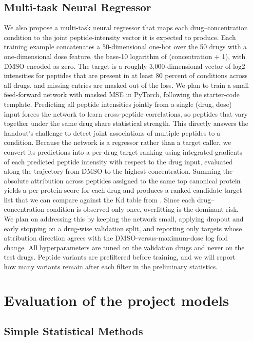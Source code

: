 \subsection{Multi-task Neural Regressor}
We also propose a multi-task neural regressor that maps each drug–concentration condition to the joint peptide-intensity vector it is expected to produce. Each training example concatenates a 50-dimensional one-hot over the 50 drugs with a one-dimensional dose feature, the base-10 logarithm of (concentration + 1), with DMSO encoded as zero. The target is a roughly 3,000-dimensional vector of log2 intensities for peptides that are present in at least 80 percent of conditions across all drugs, and missing entries are masked out of the loss. We plan to train a small feed-forward network with masked MSE in PyTorch, following the starter-code template. Predicting all peptide intensities jointly from a single (drug, dose) input forces the network to learn cross-peptide correlations, so peptides that vary together under the same drug share statistical strength. This directly answers the handout's challenge to detect joint associations of multiple peptides to a condition.
Because the network is a regressor rather than a target caller, we convert its predictions into a per-drug target ranking using integrated gradients of each predicted peptide intensity with respect to the drug input, evaluated along the trajectory from DMSO to the highest concentration. Summing the absolute attribution across peptides assigned to the same top canonical protein yields a per-protein score for each drug and produces a ranked candidate-target list that we can compare against the Kd table from \cite{klaeger2017target}. Since each drug–concentration condition is observed only once, overfitting is the dominant risk. We plan on addressing this by keeping the network small, applying dropout and early stopping on a drug-wise validation split, and reporting only targets whose attribution direction agrees with the DMSO-versus-maximum-dose log fold change. All hyperparameters are tuned on the validation drugs and never on the test drugs. Peptide variants are prefiltered before training, and we will report how many variants remain after each filter in the preliminary statistics.


\section{Evaluation of the project models}

\subsection{Simple Statistical Methods}

